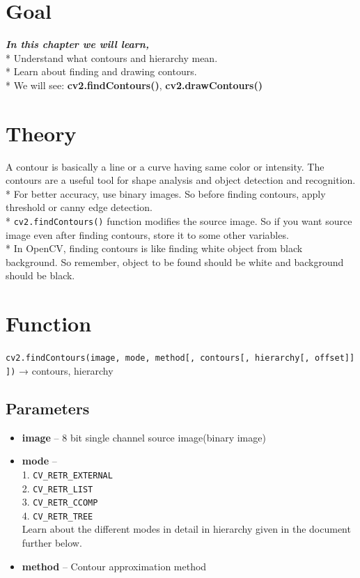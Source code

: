 \documentclass[]{article}
\date{}
\providecommand{\tightlist}{%
  \setlength{\itemsep}{0pt}\setlength{\parskip}{0pt}}
\begin{document}
\section{Goal}\label{goal}

\emph{\textbf{In this chapter we will learn,}}\\
* Understand what contours and hierarchy mean.\\
* Learn about finding and drawing contours.\\
* We will see: \textbf{cv2.findContours()}, \textbf{cv2.drawContours()}

\section{Theory}\label{theory}

A contour is basically a line or a curve having same color or intensity.
The contours are a useful tool for shape analysis and object detection
and recognition. * For better accuracy, use binary images. So before
finding contours, apply threshold or canny edge detection.\\
* \texttt{cv2.findContours()} function modifies the source image. So if
you want source image even after finding contours, store it to some
other variables.\\
* In OpenCV, finding contours is like finding white object from black
background. So remember, object to be found should be white and
background should be black.

\section{Function}\label{function}

\texttt{cv2.findContours(image,\ mode,\ method{[},\ contours{[},\ hierarchy{[},\ offset{]}{]}{]})}
→ contours, hierarchy

\subsection{Parameters}\label{parameters}

\begin{itemize}
\tightlist
\item
  \textbf{image} -- 8 bit single channel source image(binary image)\\
\item
  \textbf{mode} --\\
   1. \texttt{CV\_RETR\_EXTERNAL}\\
   2. \texttt{CV\_RETR\_LIST}\\
   3. \texttt{CV\_RETR\_CCOMP}\\
   4. \texttt{CV\_RETR\_TREE}\\
  Learn about the different modes in detail in hierarchy given in the
  document further below.\\
\item
  \textbf{method} -- Contour approximation method\\
\end{itemize}
\end{document}
